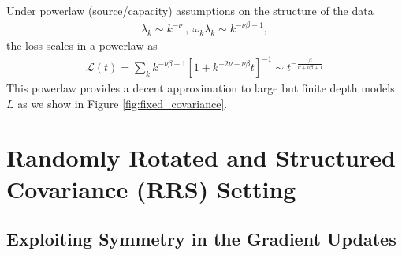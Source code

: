\documentclass{article} %
\begin{document}
Under powerlaw (source/capacity) assumptions on the structure of the data
\begin{align}
    \lambda_k \sim k^{-\nu} \ , \ \omega_k \lambda_k \sim k^{-\nu \beta - 1},
\end{align}
the loss scales in a powerlaw as 
\begin{align}
    \mathcal L(t) =   \sum_{k} k^{-\nu \beta- 1} [ 1 + k^{-2\nu - \nu \beta } t ]^{-1} \sim t^{- \frac{\beta}{\nu + \nu \beta + 1}}
\end{align}
This powerlaw provides a decent approximation to large but finite depth models $L$ as we show in Figure \ref{fig:fixed_covariance}. 

\section{Randomly Rotated and Structured Covariance (\textbf{RRS}) Setting}\label{app:rrs_setting}

\subsection{Exploiting Symmetry in the Gradient Updates}
\end{document}
